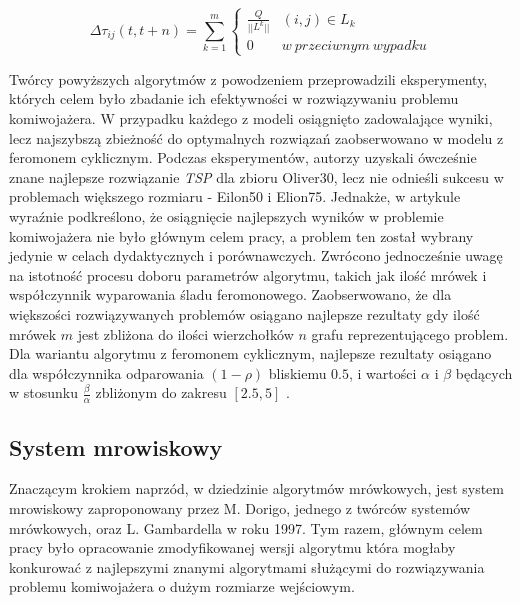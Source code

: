{{{            \begin{equation}\label{eqt:pheromone-cycle}
                \Delta\tau_{ij}(t, t + n) = \sum_{k=1}^m \left\{
                        \begin{matrix}
                            \frac{Q}{||L^k||} & (i, j) \in L_k\\
                            0 & w\ przeciwnym\ wypadku
                        \end{matrix}
                    \right.
            \end{equation}

            Twórcy powyższych algorytmów z powodzeniem przeprowadzili eksperymenty, których celem było zbadanie ich
            efektywności w rozwiązywaniu problemu komiwojażera. W przypadku każdego z modeli osiągnięto zadowalające
            wyniki, lecz najszybszą zbieżność do optymalnych rozwiązań zaobserwowano w modelu z feromonem cyklicznym.
            Podczas eksperymentów, autorzy uzyskali ówcześnie znane najlepsze rozwiązanie \textit{TSP} dla zbioru
            Oliver30, lecz nie odnieśli sukcesu w problemach większego rozmiaru - Eilon50 i Elion75. Jednakże, w
            artykule wyraźnie podkreślono, że osiągnięcie najlepszych wyników w problemie komiwojażera nie było głównym
            celem pracy, a problem ten został wybrany jedynie w celach dydaktycznych i porównawczych. Zwrócono
            jednocześnie uwagę na istotność procesu doboru parametrów algorytmu, takich jak ilość mrówek i współczynnik
            wyparowania śladu feromonowego. Zaobserwowano, że dla większości rozwiązywanych problemów osiągano najlepsze
            rezultaty gdy ilość mrówek $m$ jest zbliżona do ilości wierzchołków $n$ grafu reprezentującego problem. Dla
            wariantu algorytmu z feromonem cyklicznym, najlepsze rezultaty osiągano dla współczynnika odparowania $(1 -
            \rho)$ bliskiemu $0.5$, i wartości $\alpha$ i $\beta$ będących w stosunku $\frac{\beta}{\alpha}$ zbliżonym
            do zakresu $[2.5, 5]$ \cite{Dorigo1991AntSA}.
        }

        \subsection{System mrowiskowy}
        {
            Znaczącym krokiem naprzód, w dziedzinie algorytmów mrówkowych, jest system mrowiskowy zaproponowany przez M.
            Dorigo, jednego z twórców systemów mrówkowych, oraz L. Gambardella w roku 1997\cite{Dorigo1997AntCS}. Tym
            razem, głównym celem pracy było opracowanie zmodyfikowanej wersji algorytmu która mogłaby konkurować z
            najlepszymi znanymi algorytmami służącymi do rozwiązywania problemu komiwojażera o dużym rozmiarze
            wejściowym.

}}}
